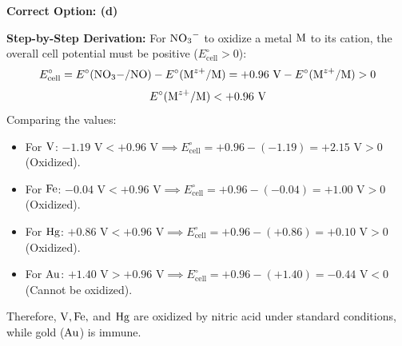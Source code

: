\begin{solution}
\textbf{Correct Option: (d)}

\textbf{Step-by-Step Derivation:}
For $\ce{NO3-}$ to oxidize a metal $\ce{M}$ to its cation, the overall cell potential must be positive ($E^\circ_{\text{cell}} > 0$):
\begin{equation*}
    E^\circ_{\text{cell}} = E^\circ(\ce{NO3-/NO}) - E^\circ(\ce{M^{z+}/M}) = +0.96\text{ V} - E^\circ(\ce{M^{z+}/M}) > 0
\end{equation*}
\begin{equation*}
    E^\circ(\ce{M^{z+}/M}) < +0.96\text{ V}
\end{equation*}
Comparing the values:
\begin{itemize}
    \item For $\ce{V}$: $-1.19\text{ V} < +0.96\text{ V} \implies E^\circ_{\text{cell}} = +0.96 - (-1.19) = +2.15\text{ V} > 0$ (Oxidized).
    \item For $\ce{Fe}$: $-0.04\text{ V} < +0.96\text{ V} \implies E^\circ_{\text{cell}} = +0.96 - (-0.04) = +1.00\text{ V} > 0$ (Oxidized).
    \item For $\ce{Hg}$: $+0.86\text{ V} < +0.96\text{ V} \implies E^\circ_{\text{cell}} = +0.96 - (+0.86) = +0.10\text{ V} > 0$ (Oxidized).
    \item For $\ce{Au}$: $+1.40\text{ V} > +0.96\text{ V} \implies E^\circ_{\text{cell}} = +0.96 - (+1.40) = -0.44\text{ V} < 0$ (Cannot be oxidized).
\end{itemize}
Therefore, $\ce{V}, \ce{Fe},$ and $\ce{Hg}$ are oxidized by nitric acid under standard conditions, while gold ($\ce{Au}$) is immune.
\end{solution}

